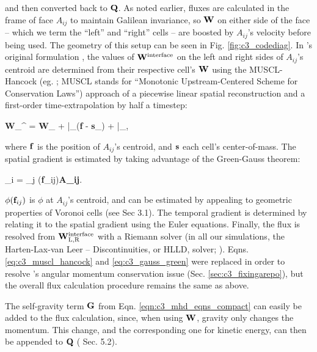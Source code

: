 \noindent and then converted back to ${\bf Q}$.  As noted earlier, fluxes are calculated in the frame of face $A_{ij}$ to maintain Galilean invariance, so ${\bf W}$ on either side of the face -- which we term the ``left'' and ``right'' cells -- are boosted by $A_{ij}$'s velocity before being used.  The geometry of this setup can be seen in {\charles Fig. \ref{fig:c3_codediag}}. In \arepo's original formulation \citep{spri10}, the values of ${\bf W}^\mathrm{interface}$ on the left and right sides of $A_{ij}$'s centroid are determined from their respective cell's ${\bf W}$ using the MUSCL-Hancock (eg. \citealt{vlee06}; MUSCL stands for ``Monotonic Upstream-Centered Scheme for Conservation Laws'')  approach of a piecewise linear spatial reconstruction and a first-order time-extrapolation by half a timestep:

\eqbegin
{\bf W}_^ = {\bf W}_ + {\bf {}}\Bigr|_({\bf f} - {\bf s}_) + {\bf {}}\Bigr|_,
\label{eq:c3_muscl_hancock}
\eqend

\noindent where ${\bf f}$ is the position of $A_{ij}$'s centroid, and ${\bf s}$ each cell's center-of-mass.  The spatial gradient is estimated by taking advantage of the Green-Gauss theorem:

\eqbegin
\left\langle \nabla \phi \right\rangle_i =  \sum_j \phi({\bf f}_{ij}){\bf A_{ij}}.
\label{eq:c3_gauss_green}
\eqend

\noindent $\phi({\bf f}_{ij})$ is $\phi$ at $A_{ij}$'s centroid, and can be estimated by appealing to geometric properties of Voronoi cells (see \cite{spri10} Sec 3.1).  The temporal gradient is determined by relating it to the spatial gradient using the Euler equations.  Finally, the flux is resolved from ${\bf W}_\mathrm{L,R}^\mathrm{interface}$ with a Riemann solver (in all our simulations, the Harten-Lax-van Leer -- Discontinuities, or HLLD, solver; \citealt{miyok05}).  Eqns. \ref{eq:c3_muscl_hancock} and \ref{eq:c3_gauss_green} were replaced in \cite{pakm+16} order to resolve \arepo's angular momentum conservation issue (Sec. \ref{sec:c3_fixingarepo}), but the overall flux calculation procedure remains the same as above.


The self-gravity term ${\bf G}$ from Eqn. \ref{eqn:c3_mhd_eqns_compact} can easily be added to the flux calculation, since, when using ${\bf W}$, gravity only changes the momentum.  This change, and the corresponding one for kinetic energy, can then be appended to ${\bf Q}$ (\citealt{spri10} Sec. 5.2).  

